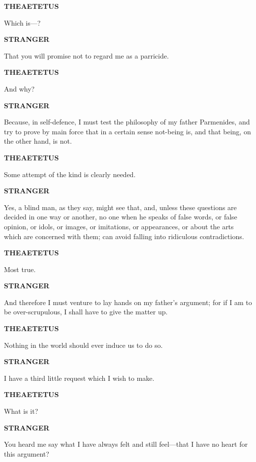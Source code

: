 \documentclass[11pt,letter]{article}
\begin{document}
\par \textbf{THEAETETUS}
\par   Which is—?

\par \textbf{STRANGER}
\par   That you will promise not to regard me as a parricide.

\par \textbf{THEAETETUS}
\par   And why?

\par \textbf{STRANGER}
\par   Because, in self-defence, I must test the philosophy of my father Parmenides, and try to prove by main force that in a certain sense not-being is, and that being, on the other hand, is not.

\par \textbf{THEAETETUS}
\par   Some attempt of the kind is clearly needed.

\par \textbf{STRANGER}
\par   Yes, a blind man, as they say, might see that, and, unless these questions are decided in one way or another, no one when he speaks of false words, or false opinion, or idols, or images, or imitations, or appearances, or about the arts which are concerned with them; can avoid falling into ridiculous contradictions.

\par \textbf{THEAETETUS}
\par   Most true.

\par \textbf{STRANGER}
\par   And therefore I must venture to lay hands on my father's argument; for if I am to be over-scrupulous, I shall have to give the matter up.

\par \textbf{THEAETETUS}
\par   Nothing in the world should ever induce us to do so.

\par \textbf{STRANGER}
\par   I have a third little request which I wish to make.

\par \textbf{THEAETETUS}
\par   What is it?

\par \textbf{STRANGER}
\par   You heard me say what I have always felt and still feel—that I have no heart for this argument?
\end{document}
